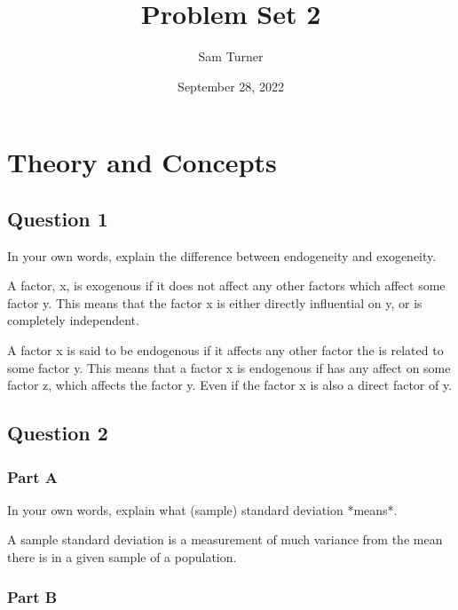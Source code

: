 \documentclass[
  letterpaper,
  DIV=11,
  numbers=noendperiod]{scrartcl}
\title{Problem Set 2}
\author{Sam Turner}
\date{September 28, 2022}
\begin{document}
\maketitle
\ifdefined\Shaded\renewenvironment{Shaded}{\begin{tcolorbox}[breakable, enhanced, interior hidden, frame hidden, borderline west={3pt}{0pt}{shadecolor}, sharp corners, boxrule=0pt]}{\end{tcolorbox}}\fi

\hypertarget{theory-and-concepts}{%
\section{Theory and Concepts}\label{theory-and-concepts}}

\hypertarget{question-1}{%
\subsection{Question 1}\label{question-1}}

In your own words, explain the difference between endogeneity and
exogeneity.

A factor, x, is exogenous if it does not affect any other factors which
affect some factor y. This means that the factor x is either directly
influential on y, or is completely independent.

A factor x is said to be endogenous if it affects any other factor the
is related to some factor y. This means that a factor x is endogenous if
has any affect on some factor z, which affects the factor y. Even if the
factor x is also a direct factor of y.

\hypertarget{question-2}{%
\subsection{Question 2}\label{question-2}}

\hypertarget{part-a}{%
\subsubsection{Part A}\label{part-a}}

In your own words, explain what (sample) standard deviation *means*.

A sample standard deviation is a measurement of much variance from the
mean there is in a given sample of a population.

\hypertarget{part-b}{%
\subsubsection{Part B}\label{part-b}}
\end{document}
